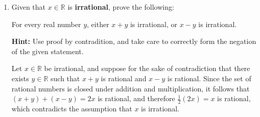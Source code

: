 \documentclass[12pt]{article}
\newcommand{\points}[1]{\marginpar{\hspace{24pt}[#1]}}
\newcommand{\R}{\mathbb{R}}
\begin{document}
\begin{enumerate}
\begin{enumerate}
\bigskip

This statement is {\bf true} (as long as you corrected the typo). 

Suppose that $a\equiv 3\pmod{5}$ and $b\equiv 2\pmod{5}$.
It follows from a result in class that $ab\equiv 3(2)\pmod{5}$, and since $3(2)=6$ and $6\equiv 1\pmod{5}$, it follows that $ab\equiv 1\pmod{5}$.

\vspace{0.5in}

{\bf Alternative (slightly less short) proof}: Suppose that $a\equiv 3\pmod{5}$ and $b\equiv 2\pmod{5}$.  It follows that there exist integers $k$ and $l$ such that $a=5k+3$ and $b=5l+2$. Thus
\[
 ab = (5k+3)(5l+2) = 25kl+10k+15l+6 = 5(5kl+2k+3l+1)+1,
\]
and therefore $ab\equiv 1\pmod{5}$.

\vspace{0.5in}

\item For any integers $a$ and $b$, if $ab\equiv 0\pmod{12}$, then $a\equiv 0\pmod{12}$ or $b\equiv 0 \pmod{12}$. \points{4}

\bigskip

This statement is false. For example, consider $a=3$ and $b=4$. Then $ab=12$ and $12\equiv 0\pmod{12}$, but $3\not\equiv 0\pmod{12}$ and $4\not\equiv 0\pmod{12}$.

\vspace{1in}

\item For any integers $a$, $b$, and $c$, if $a|b$ and $a|c$, then $a|(2b-3c)$.\points{4}

\bigskip

This statement is true. Suppose that $a|b$ and $a|c$. Then there exist integers $k$ and $l$ such that $b=ak$ and $c=al$, and thus
\[
 2b-3c = 2(ak)-3(al) = a(2k)-a(3l)=a(2k-3l).
\]
Since $2b-3c$ can be written as a multiple of $a$, it follows that $a|(2b-3c)$.
\end{enumerate}
\newpage

\item Given that $x\in\R$ is {\bf irrational}, prove the following:   \points{5}
\begin{center}
 For every real number $y$, either $x+y$ is irrational, or $x-y$ is irrational.
\end{center}
{\bf Hint:} Use proof by contradition, and take care to correctly form the negation of the given statement.

\bigskip

Let $x\in\R$ be irrational, and suppose for the sake of contradiction that there exists $y\in\R$ such that $x+y$ is rational and $x-y$ is rational. Since the set of rational numbers is closed under addition and multiplication, it follows that $(x+y)+(x-y)=2x$ is rational, and therefore $\frac{1}{2}(2x) = x$ is rational, which contradicts the assumption that $x$ is irrational.


\end{enumerate}
\end{document}
